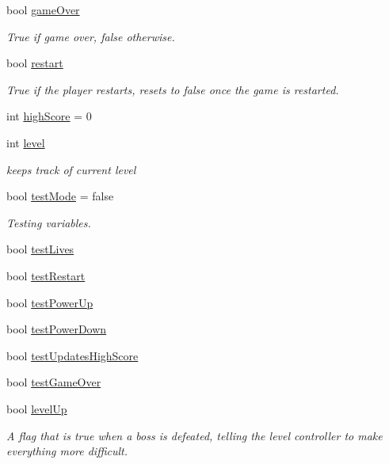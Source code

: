 \begin{DoxyCompactItemize}
bool \mbox{\hyperlink{class_player_controller_a2043c4af0099d9ef9b126794cdb08363}{game\+Over}}
\begin{DoxyCompactList}\small\item\em True if game over, false otherwise. \end{DoxyCompactList}\item 
bool \mbox{\hyperlink{class_player_controller_a5009280ff718bf792e6c49be57d2d961}{restart}}
\begin{DoxyCompactList}\small\item\em True if the player restarts, resets to false once the game is restarted. \end{DoxyCompactList}\item 
int \mbox{\hyperlink{class_player_controller_adba61318804b2e3f908c6e3290ca755d}{high\+Score}} = 0
\item 
int \mbox{\hyperlink{class_player_controller_a72b14fadfbe633bb3ba317b2a59c557e}{level}}
\begin{DoxyCompactList}\small\item\em keeps track of current level \end{DoxyCompactList}\item 
bool \mbox{\hyperlink{class_player_controller_a99608cc786dba21c5c1dc22f4cef1327}{test\+Mode}} = false
\begin{DoxyCompactList}\small\item\em Testing variables. \end{DoxyCompactList}\item 
bool \mbox{\hyperlink{class_player_controller_a9dcb593b13e3fd9145f5d749a0931eb0}{test\+Lives}}
\item 
bool \mbox{\hyperlink{class_player_controller_a2de6872ee0710f0969004e1b26b01e47}{test\+Restart}}
\item 
bool \mbox{\hyperlink{class_player_controller_affbbdfb14b0f101485d4dc1a54883f38}{test\+Power\+Up}}
\item 
bool \mbox{\hyperlink{class_player_controller_aa8cf3b4a76e12592ce5b52bf5a6dae35}{test\+Power\+Down}}
\item 
bool \mbox{\hyperlink{class_player_controller_aa95666d7ebdc47342a0fe58a8c58d846}{test\+Updates\+High\+Score}}
\item 
bool \mbox{\hyperlink{class_player_controller_a96474cb76d48047171329a05522f12a3}{test\+Game\+Over}}
\item 
bool \mbox{\hyperlink{class_player_controller_a40ca018dd43b840f93242df83148ee37}{level\+Up}}
\begin{DoxyCompactList}\small\item\em A flag that is true when a boss is defeated, telling the level controller to make everything more difficult. \end{DoxyCompactList}\end{DoxyCompactItemize}


